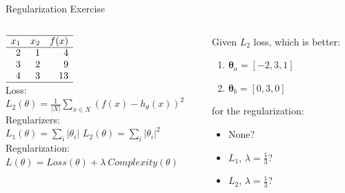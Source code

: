 \documentclass[14pt]{beamer}
\begin{document}
\begin{frame}[label=regularization-exercise]{Regularization Exercise}
\begin{columns}[T]
\begin{column}{0.49\textwidth}
{\centering
$\begin{array}{ r r r }
\hline
x_1 & x_2 & f(x) \\
\hline
2 & 1 & 4 \\
3 & 2 & 9 \\
4 & 3 & 13 \\
\hline
\end{array}$\\}
\bigskip
\bigskip
Loss:\\
{\small$\displaystyle L_2(\theta) = \frac{1}{|X|} \sum_{x \in X} \left( f(x) - h_{\theta}(x) \right)^2$}\\
Regularizers:\\
{\small$\displaystyle L_1(\theta) = \sum_{i} | \theta_{i} |$ \hfill $\displaystyle L_2(\theta) = \sum_{i} | \theta_{i} |^{2}$}\\
Regularization:\\
{\small$\displaystyle L(\theta) = Loss(\theta) + \lambda \: Complexity(\theta)$}\\
\end{column}
\begin{column}{0.55\textwidth}
\setlength{\leftmargini}{1.25em}
Given $L_2$ loss, which is better:
\begin{enumerate}
\item $\bm{\theta}_{a} = [-2, 3, 1]$
\item $\bm{\theta}_{b} = [0, 3, 0]$
\end{enumerate}
for the regularization:
\begin{itemize}
\item None?
\item $L_1$, $\lambda=\frac{1}{3}$?
\item $L_2$, $\lambda=\frac{1}{3}$?

\end{itemize}
\end{column}
\end{columns}
\end{frame}
\end{document}
